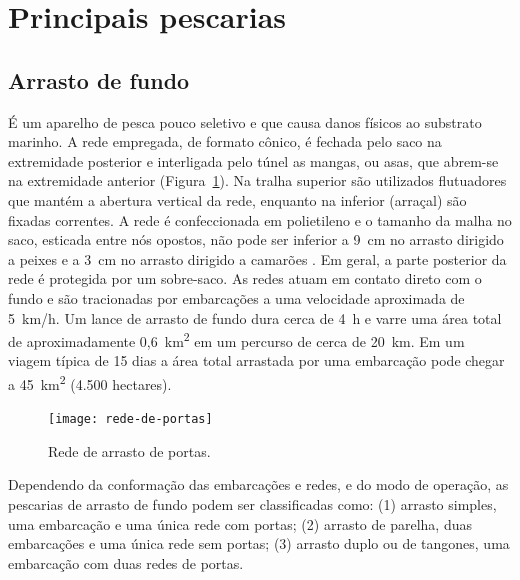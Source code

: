 \documentclass[a4paper,11pt,twoside,showtrims,onecolumn,openright,final]{memoir}
\begin{document}
\section*{Principais pescarias}

\subsection*{Arrasto de fundo}

É um aparelho de pesca pouco seletivo e que causa danos físicos ao substrato marinho. 
A rede empregada, de formato cônico, é fechada pelo saco na extremidade posterior e 
interligada pelo túnel as mangas, ou asas, que abrem-se na extremidade anterior (Figura~\ref{fig:redeportas}). 
Na tralha superior são utilizados flutuadores que mantém a abertura vertical da rede, 
enquanto na inferior (arraçal) são fixadas correntes. A rede é confeccionada em polietileno e o 
tamanho  da malha no saco, esticada entre nós opostos, não pode ser inferior a 9~cm no 
arrasto dirigido a peixes \citep{sudepe1983} e a 3~cm no arrasto dirigido a camarões \citep{sudepe1984}. 
Em geral, a parte posterior da rede é protegida por um sobre-saco. As redes atuam em contato 
direto com o fundo e são tracionadas por embarcações a uma velocidade aproximada de 5~km/h. 
Um lance de arrasto de fundo dura cerca de 4~h e varre uma área total de 
aproximadamente 0,6~km\textsuperscript{2} em um percurso de cerca de 20~km. 
Em um viagem típica de 15 dias a área total arrastada por uma 
embarcação pode chegar a 45~km\textsuperscript{2} (4.500 hectares). 

%
%

\begin{figure}
\begin{center}
\texttt{[image: rede-de-portas]}
\end{center}
\caption{Rede de arrasto de portas.}
\label{fig:redeportas}
\end{figure}


Dependendo da conformação das embarcações e redes, e do modo de operação, as pescarias de arrasto 
de fundo podem ser classificadas como: (1) arrasto simples, uma embarcação e uma única rede com 
portas; (2) arrasto de parelha, duas embarcações e uma única rede sem portas; (3) arrasto duplo 
ou de tangones, uma embarcação com duas redes de portas. 
\end{document}
